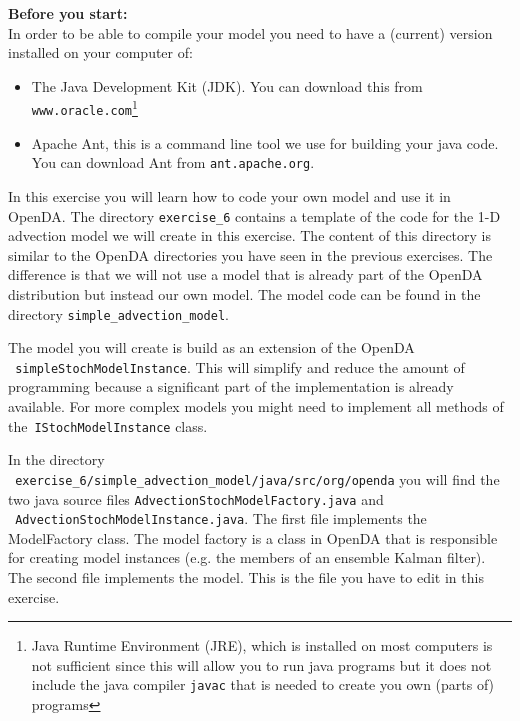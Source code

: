 
{\bf Before you start:}\\
In order to be able to compile your model you need to have a (current) version
installed on your computer of:
\begin{itemize}
\item The Java Development Kit (JDK). You can download this from\\
      {\tt www.oracle.com}\footnote{Java Runtime Environment (JRE), which is
      installed on most computers is not sufficient since this will allow you
      to run java programs but it does not include the java compiler {\tt javac} that is
      needed to create you own (parts of) programs}
\item Apache Ant, this is a command line tool we use for building your java
      code. You can download Ant from {\tt ant.apache.org}.
\end{itemize}

In this exercise you will learn how to code your own model and use it in
OpenDA. The directory {\tt exercise\_6} contains a template of the code for the
1-D advection model we will create in this exercise. The content of this
directory is similar to the OpenDA directories you have seen in the previous
exercises. The difference is that we will not use a model that is already part
of the OpenDA distribution but instead our own model. The model code can be
found in the directory {\tt simple\_advection\_model}.

The model you will create is build as an extension of the OpenDA \\{\tt
  simpleStochModelInstance}. This will simplify and reduce the amount of
programming because a significant part of the implementation is already
available. For more complex models you might need to implement all methods of
the\ {\tt IStochModelInstance} class.

In the directory\\ {\tt
  exercise\_6/simple\_advection\_model/java/src/org/openda} you will find the
two java source files {\tt AdvectionStochModelFactory.java} and\\ {\tt
  AdvectionStochModelInstance.java}. The first file implements the ModelFactory
class. The model factory is a class in OpenDA that is responsible for creating
model instances (e.g. the members of an ensemble Kalman filter). The second
file implements the model. This is the file you have to edit in this exercise.

